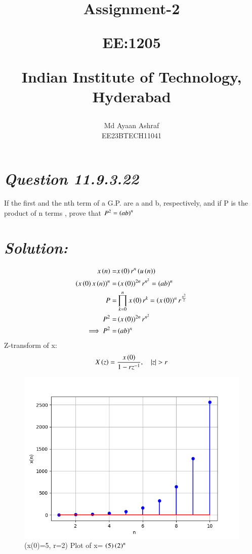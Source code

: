 \documentclass[journal,12pt,twocolumn]{IEEEtran}
\theoremstyle{remark}
\begin{document}
%




\vspace{3cm}

\title{
Assignment-2

\large{EE:1205 }

Indian Institute of Technology, Hyderabad
}
\author{Md Ayaan Ashraf

EE23BTECH11041
}  
\maketitle
\newpage
\bigskip
\renewcommand{\thefigure}{\theenumi}
\renewcommand{\thetable}{\theenumi}
\section*{\textit{\textbf{Question 11.9.3.22}}}
 If the first and the nth term of a G.P. are a and b, respectively, and if P is the product of n terms , prove that $ P^2 = \left(ab\right)^n $
\section*{\textit{\textbf{Solution:}}}

\begin{align}
x\left(n\right) = & x\left(0\right)r^{n} \left(u\left(n\right)\right)\\
\left(x\left(0\right)x\left(n\right)\right)^n = & \left(x\left(0\right)\right)^{2n} r^{n^2}= \left(ab\right)^n\\
P =& \prod_{k=0}^{n} x\left(0\right)r^{k}= \left(x\left(0\right)\right)^n r^{\frac{n^2}{2}}\\
P^2 =& \left(x\left(0\right)\right)^{2n} r^{n^2}\\
\implies  P^2 =& \left(ab\right)^n \\
\end {align}
Z-transform of x:
\begin{align}
X\brak{z}= \frac{x\brak{0}}{1-rz^{-1}} , \quad{|z|>r}
\end{align}
\begin{figure}[ht]
    \centering
    \includegraphics[width=\columnwidth]{figs/fig.png}
    \caption{(x(0)=5, r=2) Plot of x= $\left(5\right)\left(2\right)^n$}
    \label{fig: 11.9.3.22}
\end{figure}
\end{document}
